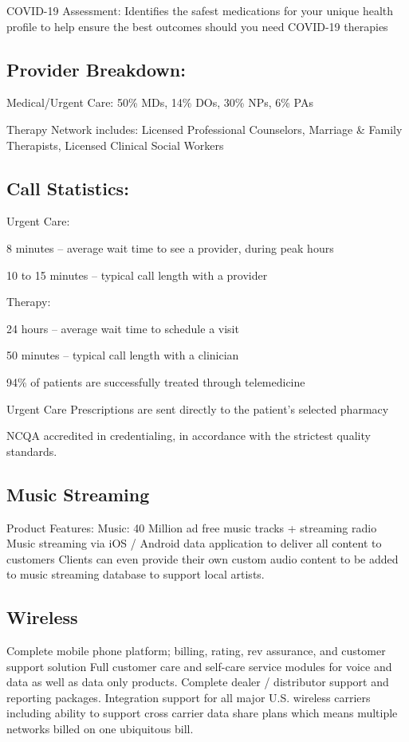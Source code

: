 \documentclass[11pt]{article}
\begin{document}
COVID-19 Assessment: Identifies the safest medications for your unique health profile to help ensure the best outcomes should you need COVID-19 therapies


\subsection{Provider Breakdown:}

Medical/Urgent Care: 50\% MDs, 14\% DOs, 30\% NPs, 6\% PAs


Therapy Network includes: Licensed Professional Counselors, Marriage \& Family Therapists, Licensed Clinical Social Workers


\subsection{Call Statistics:}

Urgent Care:


8 minutes -- average wait time to see a provider, during peak hours


10 to 15 minutes -- typical call length with a provider


Therapy:


24 hours -- average wait time to schedule a visit


50 minutes -- typical call length with a clinician


94\% of patients are successfully treated through telemedicine


Urgent Care Prescriptions are sent directly to the patient's selected pharmacy


NCQA accredited in credentialing, in accordance with the strictest quality standards.


\subsection{Music Streaming}

Product Features: Music: 40 Million ad free music tracks + streaming radio Music streaming via iOS / Android data application to deliver all content to customers Clients can even provide their own custom audio content to be added to music streaming database to support local artists.


\subsection{Wireless}

Complete mobile phone platform; billing, rating, rev assurance, and customer support solution Full customer care and self-care service modules for voice and data as well as data only products. Complete dealer / distributor support and reporting packages. Integration support for all major U.S. wireless carriers including ability to support cross carrier data share plans which means multiple networks billed on one ubiquitous bill.
\end{document}

